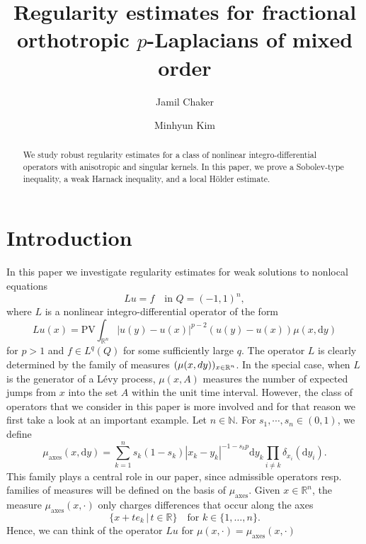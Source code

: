 \documentclass[11pt]{amsart}
\title[Fractional orthotropic $p$-Laplacians]{Regularity estimates for fractional orthotropic $p$-Laplacians of mixed order}
\author{Jamil Chaker}
\author{Minhyun Kim}
\theoremstyle{plain}
\theoremstyle{definition}
\numberwithin{equation}{section}
\renewcommand{\d}{\textnormal{d}}
\newcommand{\N}{\mathbb{N}}
\newcommand{\R}{\mathbb{R}}
\newcommand{\ma}{\mu_{\mathrm{axes}}}
\begin{document}
\begin{abstract}
We study robust regularity estimates for a class of nonlinear integro-differential operators with anisotropic and singular kernels. In this paper, we prove a Sobolev-type inequality, a weak Harnack inequality, and a local H\"older estimate.
\end{abstract}

\maketitle



\section{Introduction} \label{sec:introduction}
In this paper we investigate regularity estimates for weak solutions to nonlocal equations 
\begin{equation}\label{eq:PDE}
 Lu=f \quad \text{in } Q=(-1,1)^n,
\end{equation}
where $L$ is a nonlinear integro-differential operator of the form
\begin{equation}\label{def:nonlocaloperator}
Lu(x) = \mathrm{PV} \int_{\mathbb{R}^n} |u(y) - u(x)|^{p-2} (u(y)-u(x)) \mu(x, \mathrm{d}y)
\end{equation}
for $p > 1$ and $f\in L^q(Q)$ for some sufficiently large $q$. 
The operator $L$ is clearly determined by the family of measures $(\mu(x,\d y))_{x\in\R^n}$. In the special case, when $L$ is the generator of a L\'evy process, $\mu(x,A)$ measures the number of expected jumps from $x$ into the set $A$ within the unit time interval. However, the class of operators that we consider in this paper is more involved and for that reason we first take a look at an important example.
Let $n\in\N$. For $s_1, \cdots, s_n \in (0,1)$, we define
\begin{equation*}
\mu_{\mathrm{axes}}(x,\mathrm{d}y) = \sum_{k=1}^n s_k(1-s_k) |x_k-y_k|^{-1-s_k p} \mathrm{d}y_k \prod_{i\neq k} \delta_{x_i}(\mathrm{d}y_i).
\end{equation*}
This family plays a central role in our paper, since admissible operators resp. families of measures will be defined on the basis of $\ma$.
Given $x\in\R^n$, the measure $\ma(x,\cdot)$ only charges differences that occur along the axes
\[ \{x+te_k \, | \, t\in\R\} \quad \text{for } k\in\{1,\dots,n\}. \]
Hence, we can think of the operator $Lu$ for $\mu(x,\cdot)=\ma(x,\cdot)$
\end{document}
